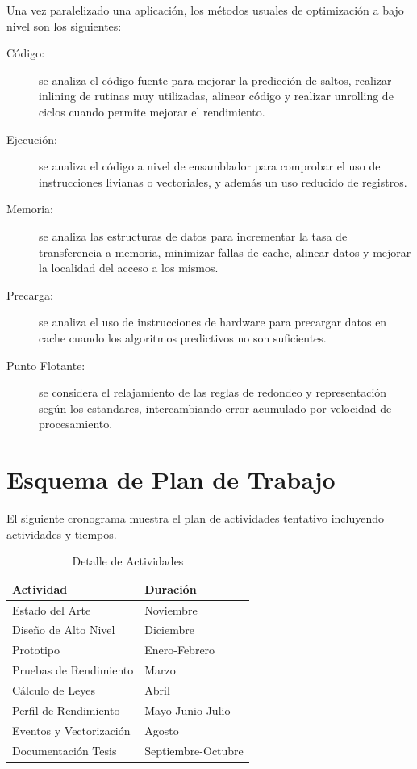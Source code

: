 \documentclass[a4paper]{article}
\begin{document}
Una vez paralelizado una aplicación, los métodos usuales de optimización a bajo nivel son los siguientes:

\begin{description}
\item[Código:] se analiza el código fuente para mejorar la predicción de saltos, realizar inlining de rutinas muy utilizadas, alinear código y realizar unrolling de ciclos cuando permite mejorar el rendimiento.
\item[Ejecución:] se analiza el código a nivel de ensamblador para comprobar el uso de instrucciones livianas o vectoriales, y además un uso reducido de registros.
\item[Memoria:] se analiza las estructuras de datos para incrementar la tasa de transferencia a memoria, minimizar fallas de cache, alinear datos y mejorar la localidad del acceso a los mismos.
\item[Precarga:] se analiza el uso de instrucciones de hardware para precargar datos en cache cuando los algoritmos predictivos no son suficientes.
\item[Punto Flotante:] se considera el relajamiento de las reglas de redondeo y representación según los estandares, intercambiando error acumulado por velocidad de procesamiento.
\end{description}

\section{Esquema de Plan de Trabajo}

El siguiente cronograma muestra el plan de actividades tentativo incluyendo actividades y tiempos.

\begin{table}[H]
  \caption{Detalle de Actividades}
  \centering
    \begin{tabular}{|l|l|}\hline
      {\bf Actividad} & {\bf Duración} \\ \hline
	Estado del Arte & Noviembre \\ \hline
      Diseño de Alto Nivel & Diciembre \\ \hline
      Prototipo & Enero-Febrero \\ \hline
      Pruebas de Rendimiento & Marzo \\ \hline
      Cálculo de Leyes & Abril \\ \hline
      Perfil de Rendimiento & Mayo-Junio-Julio \\ \hline
      Eventos y Vectorización & Agosto \\ \hline
      Documentación Tesis & Septiembre-Octubre \\ \hline
    \end{tabular}
  \label{schedule}
\end{table}
\end{document}
